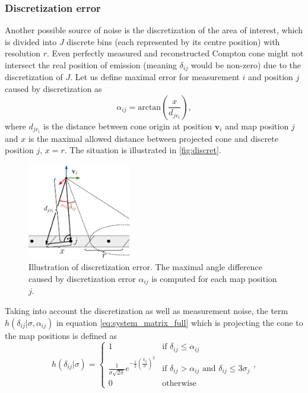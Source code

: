 \subsubsection{Discretization error}
Another possible source of noise is the discretization of the area of interest, which is divided into $J$ discrete bins (each represented by its centre position) with resolution $r$.
Even perfectly measured and reconstructed Compton cone might not intersect the real position of emission (meaning $\delta_{ij}$ would be non-zero) due to the discretization of $J$.
Let us define maximal error for measurement $i$ and position $j$ caused by discretization as
\begin{equation}
  \alpha_{ij} = \mathrm{arctan}(\frac{x}{d_{jv_{i}}}),
  \label{eq:alpha}
\end{equation}
where $d_{jv_{i}}$ is the distance between cone origin at position $\mathbf{v}_{i}$ and map position $j$ and $x$ is the maximal allowed distance between projected cone and discrete position $j$, $x = r$.
The situation is illustrated in  \autoref{fig:discret}.
\begin{figure}
  \centering
\includegraphics[width=0.4\textwidth]{./fig/photos/disc_ve2.eps}
  \caption{ 
Illustration of discretization error. The maximal angle difference caused by discretization error $\alpha_{ij}$ is computed for each map position $j$.}
  \label{fig:discret}
\end{figure}
Taking into account the discretization as well as measurement noise, the term $h(\delta_{ij}|\sigma, \alpha_{ij})$ in equation \ref{eq:system_matrix_full} which is projecting the cone to the map positions is defined as
\begin{equation}
h(\delta_{ij}|\sigma) =
\begin{cases}
1 & \text{if $\delta_{ij}\leq \alpha_{ij}$}\\ 
\frac{1}{\sigma\sqrt{2\pi}}e^{- \frac{1}{2}(\frac{\delta_{ij}}{\sigma})^{2}} & \text{if $\delta_{ij} > \alpha_{ij}$ and  $\delta_{ij} \leq 3\sigma_{j}$} \\
0 & \text{otherwise}
\end{cases}, 
\end{equation}
